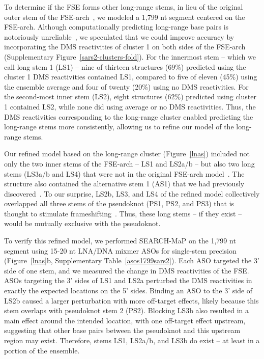 \documentclass[main.tex]{subfiles}
\begin{document}
To determine if the FSE forms other long-range stems, in lieu of the original outer stem of the FSE-arch~\cite{Ziv2020}, we modeled a 1,799 nt segment centered on the FSE-arch.
Although computationally predicting long-range base pairs is notoriously unreliable~\cite{Doshi2004,Nicholson2015}, we speculated that we could improve accuracy by incorporating the DMS reactivities of cluster 1 on both sides of the FSE-arch (Supplementary Figure~\ref{sars2-clusters-fold}).
For the innermost stem -- which we call long stem 1 (LS1) -- nine of thirteen structures (69\%) predicted using the cluster 1 DMS reactivities contained LS1, compared to five of eleven (45\%) using the ensemble average and four of twenty (20\%) using no DMS reactivities.
For the second-most inner stem (LS2), eight structures (62\%) predicted using cluster 1 contained LS2, while none did using average or no DMS reactivities.
Thus, the DMS reactivities corresponding to the long-range cluster enabled predicting the long-range stems more consistently, allowing us to refine our model of the long-range stems.

Our refined model based on the long-range cluster (Figure~\ref{lnas}) included not only the two inner stems of the FSE-arch -- LS1 and LS2a/b -- but also two long stems (LS3a/b and LS4) that were not in the original FSE-arch model~\cite{Ziv2020}.
The structure also contained the alternative stem 1 (AS1) that we had previously discovered~\cite{Lan2022}.
To our surprise, LS2b, LS3, and LS4 of the refined model collectively overlapped all three stems of the pseudoknot (PS1, PS2, and PS3) that is thought to stimulate frameshifting~\cite{Kelly2020,KZhang2021,Jones2022}.
Thus, these long stems -- if they exist -- would be mutually exclusive with the pseudoknot.

To verify this refined model, we performed SEARCH-MaP on the 1,799 nt segment using 15-20 nt LNA/DNA mixmer ASOs for single-stem precision (Figure~\ref{lnas}b, Supplementary Table~\ref{asos1799sars2}).
Each ASO targeted the 3' side of one stem, and we measured the change in DMS reactivities of the FSE.
ASOs targeting the 3' sides of LS1 and LS2a perturbed the DMS reactivities in exactly the expected locations on the 5' sides.
Binding an ASO to the 3' side of LS2b caused a larger perturbation with more off-target effects, likely because this stem overlaps with pseudoknot stem 2 (PS2).
Blocking LS3b also resulted in a main effect around the intended location, with one off-target effect upstream, suggesting that other base pairs between the pseudoknot and this upstream region may exist.
Therefore, stems LS1, LS2a/b, and LS3b do exist -- at least in a portion of the ensemble.
\end{document}

